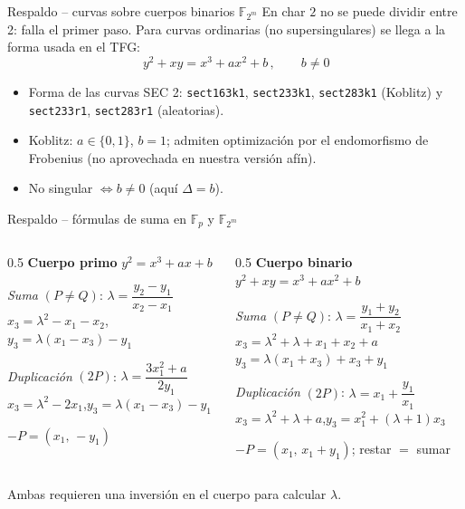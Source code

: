 \documentclass[aspectratio=169,11pt]{beamer}
\begin{document}
\begin{frame}{Respaldo -- curvas sobre cuerpos binarios $\mathbb{F}_{2^m}$}
  \small
  En char $2$ \alert{no se puede dividir entre 2}: falla el primer paso. Para curvas
  \alert{ordinarias} (no supersingulares) se llega a la forma usada en el TFG:
  \[ \boxed{\,y^2 + xy = x^3 + ax^2 + b\,},\qquad b \neq 0 \]
  \begin{itemize}\footnotesize
    \item Forma de las curvas \alert{SEC 2}: \texttt{sect163k1}, \texttt{sect233k1},
      \texttt{sect283k1} (Koblitz) y \texttt{sect233r1}, \texttt{sect283r1} (aleatorias).
    \item Koblitz: $a\in\{0,1\}$, $b=1$; admiten optimización por el endomorfismo de
      Frobenius (no aprovechada en nuestra versión afín).
    \item No singular $\iff b\neq 0$ (aquí $\Delta = b$).
  \end{itemize}
\end{frame}

\begin{frame}{Respaldo -- fórmulas de suma en $\mathbb{F}_p$ y $\mathbb{F}_{2^m}$}
  \scriptsize
  \begin{columns}[t]
    \begin{column}{0.5\textwidth}
      \textbf{Cuerpo primo}\; $y^2=x^3+ax+b$
      \vspace{0.6ex}

      \emph{Suma} $(P\neq Q)$:\; $\lambda=\dfrac{y_2-y_1}{x_2-x_1}$\\[0.4ex]
      $x_3=\lambda^2-x_1-x_2$,\quad $y_3=\lambda(x_1-x_3)-y_1$
      \vspace{0.8ex}

      \emph{Duplicación} $(2P)$:\; $\lambda=\dfrac{3x_1^2+a}{2y_1}$\\[0.4ex]
      $x_3=\lambda^2-2x_1$,\quad $y_3=\lambda(x_1-x_3)-y_1$
      \vspace{0.8ex}

      $-P=(x_1,\,-y_1)$
    \end{column}
    \begin{column}{0.5\textwidth}
      \textbf{Cuerpo binario}\; $y^2+xy=x^3+ax^2+b$
      \vspace{0.6ex}

      \emph{Suma} $(P\neq Q)$:\; $\lambda=\dfrac{y_1+y_2}{x_1+x_2}$\\[0.4ex]
      $x_3=\lambda^2+\lambda+x_1+x_2+a$\\[0.2ex]
      $y_3=\lambda(x_1+x_3)+x_3+y_1$
      \vspace{0.8ex}

      \emph{Duplicación} $(2P)$:\; $\lambda=x_1+\dfrac{y_1}{x_1}$\\[0.4ex]
      $x_3=\lambda^2+\lambda+a$,\quad $y_3=x_1^2+(\lambda+1)x_3$
      \vspace{0.8ex}

      $-P=(x_1,\,x_1+y_1)$;\; restar $=$ sumar
    \end{column}
  \end{columns}
  \vspace{1ex}
  \centering\small\alert{Ambas requieren una inversión} en el cuerpo para calcular $\lambda$.
\end{frame}
\end{document}
